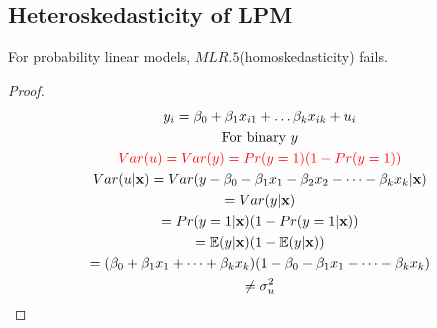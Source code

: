\documentclass[]{article}
\begin{document}
		\subsection{Heteroskedasticity of LPM}
			\begin{remark}
				For probability linear models, $MLR.5$(homoskedasticity) fails.
			\end{remark}
			\begin{proof}
				\begin{gather}
					y_i = \beta_0 + \beta_1 x_{i1} + \dots \beta_k x_{ik} + u_i \\
					\text{{For binary $y$}} \\
					\textcolor{red}{
						Var(u) = Var(y) = Pr(y=1) (1-Pr(y=1))
					} \\
					Var(u|\textbf{x}) = Var(y - \beta_0 - \beta_1 x_1 - \beta_2 x_2 - \dots - \beta_k x_k | \textbf{x}) \\
					= Var(y | \textbf{x}) \\
					= Pr(y=1|\textbf{x}) (1-Pr(y=1|\textbf{x})) \\
					= \mathbb{E}({y | \textbf{x}}) (1 - \mathbb{E}({y | \textbf{x}})) \\
					= (\beta_0 + \beta_1 x_1 + \dots + \beta_k x_k) (1 - \beta_0 - \beta_1 x_1 - \dots - \beta_k x_k) \\
					\neq \sigma_u^2
				\end{gather}
			\end{proof}
			
			
\end{document}
